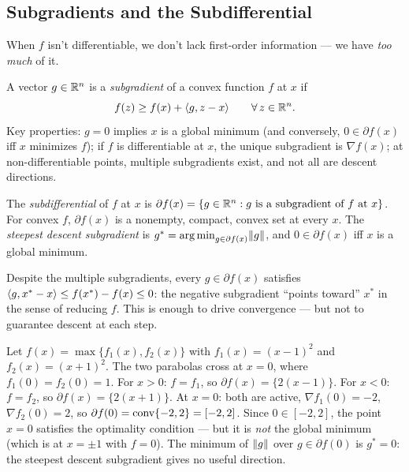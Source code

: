 \subsection{Subgradients and the Subdifferential}\label{ssec:subgradients}

When $f$ isn't differentiable, we don't lack first-order information --- we have \emph{too much} of it.

\begin{defn}[Subgradient]\label{def:subgradient}
	A vector $g \in \mathbb{R}^n$ is a \textit{subgradient} of a convex function $f$ at $x$ if
	\begin{equation}\label{eq:subgradient-condition}
		f(z) \geq f(x) + \langle g, z - x\rangle \qquad \forall\, z \in \mathbb{R}^n.
	\end{equation}
	Key properties: $g = 0$ implies $x$ is a global minimum (and conversely, $0 \in \partial f(x)$ iff $x$ minimizes $f$);
	if $f$ is differentiable at $x$, the unique subgradient is $\nabla f(x)$;
	at non-differentiable points, multiple subgradients exist, and not all are descent directions.
\end{defn}

\begin{defn}[Subdifferential]\label{def:subdifferential}
	The \textit{subdifferential} of $f$ at $x$ is
	$\partial f(x) = \{g \in \mathbb{R}^n : g \text{ is a subgradient of } f \text{ at } x\}$.
	For convex $f$, $\partial f(x)$ is a nonempty, compact, convex set at every $x$.
	The \textit{steepest descent subgradient} is $g^* = \operatorname*{arg\,min}_{g \in \partial f(x)} \lVert g\rVert$, and $0 \in \partial f(x)$ iff $x$ is a global minimum.
\end{defn}

Despite the multiple subgradients, every $g \in \partial f(x)$ satisfies $\langle g, x^* - x\rangle \leq f(x^*) - f(x) \leq 0$: the negative subgradient ``points toward'' $x^*$ in the sense of reducing $f$.
This is enough to drive convergence --- but not to guarantee descent at each step.

\begin{exm}\label{exm:subdiff-max}
	Let $f(x) = \max\{f_1(x), f_2(x)\}$ with $f_1(x) = (x-1)^2$ and $f_2(x) = (x+1)^2$.
	The two parabolas cross at $x = 0$, where $f_1(0) = f_2(0) = 1$.
	For $x > 0$: $f = f_1$, so $\partial f(x) = \{2(x-1)\}$.
	For $x < 0$: $f = f_2$, so $\partial f(x) = \{2(x+1)\}$.
	At $x = 0$: both are active, $\nabla f_1(0) = -2$, $\nabla f_2(0) = 2$, so $\partial f(0) = \operatorname{conv}\{-2, 2\} = [-2, 2]$.
	Since $0 \in [-2, 2]$, the point $x = 0$ satisfies the optimality condition --- but it is \emph{not} the global minimum (which is at $x = \pm 1$ with $f = 0$).
	The minimum of $\lVert g\rVert$ over $g \in \partial f(0)$ is $g^* = 0$: the steepest descent subgradient gives no useful direction.
\end{exm}

